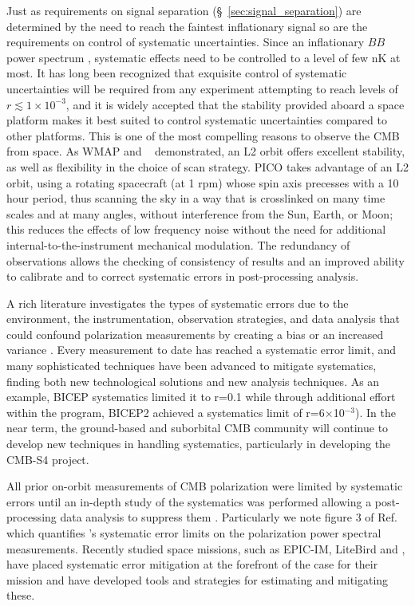 \documentclass[PICOReport.tex]{subfiles}
\begin{document}
Just as requirements on signal separation (\S~\ref{sec:signal_separation}) are determined by the need to reach the faintest inflationary signal so are the requirements on control of systematic uncertainties. Since an inflationary $BB$ power spectrum , systematic effects need to be controlled to a level of few nK at most. It has long been recognized that exquisite control of systematic uncertainties will be required from any experiment attempting to reach levels of $r \lesssim 1\times 10^{-3}$, and it is widely accepted that the stability provided aboard a space platform makes it best suited to control systematic uncertainties compared to other platforms. This is one of the most compelling reasons to observe the CMB from space.  As WMAP and \planck~ demonstrated, an L2 orbit offers excellent stability, as well as flexibility in the choice of scan strategy.  PICO takes advantage of an L2 orbit, using a rotating spacecraft (at 1 rpm) whose spin axis precesses with a 10 hour period, thus scanning the sky in a way that is crosslinked on many time scales and at many angles, without interference from the Sun, Earth, or Moon; this reduces the effects of low frequency noise without the need for additional internal-to-the-instrument mechanical modulation. The redundancy of observations allows the checking of consistency of results and an improved ability to calibrate and to correct systematic errors in post-processing analysis.

A rich literature investigates the types of systematic errors due to the environment, the instrumentation, observation strategies, and data analysis that could confound polarization measurements by creating a bias or an increased variance \cite{hu03,shimon2008,yadav2010}. Every measurement to date has  reached a systematic error limit,  and many sophisticated techniques have been advanced to mitigate systematics, finding both new technological solutions and new analysis techniques. As an example, BICEP systematics limited it to r=0.1\cite{Takahashi2010} while through additional effort within the program, BICEP2 achieved a systematics limit of r=6$\times$10$^{-3}$\cite{BICEP2_III}). In the near term, the ground-based and suborbital CMB community will continue to develop new techniques in handling systematics, particularly in developing the CMB-S4 project.

All prior on-orbit measurements of CMB polarization were limited by systematic errors until an in-depth study of the systematics was performed allowing a post-processing data analysis to suppress them \cite{Bennett13,planck2016_xlvi,Planck2018_I}. Particularly we note figure 3 of Ref.\cite{Planck2018_I} which quantifies \planck's systematic error limits on the polarization power spectral measurements. Recently studied space missions, such as EPIC-IM, LiteBird and  \core, have placed systematic error mitigation at the forefront of the case for their mission and have developed tools and strategies for estimating and mitigating these\cite{hazumi2012,wallis2017,Natoli2018}.
\end{document}
